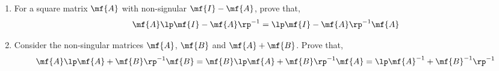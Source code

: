 \begin{enumerate}
    \item For a square matrix $\mf{A}$ with non-signular $\mf{I} - \mf{A}$, prove that, 
    \[ \mf{A}\lp\mf{I} - \mf{A}\rp^{-1} = \lp\mf{I} - \mf{A}\rp^{-1}\mf{A} \]

    \item Consider the non-singular matrices $\mf{A}$, $\mf{B}$ and $\mf{A} + \mf{B}$. Prove that, 
    \[ \mf{A}\lp\mf{A} + \mf{B}\rp^{-1}\mf{B} = \mf{B}\lp\mf{A} + \mf{B}\rp^{-1}\mf{A} = \lp\mf{A}^{-1} + \mf{B}^{-1}\rp^{-1} \]
\end{enumerate}